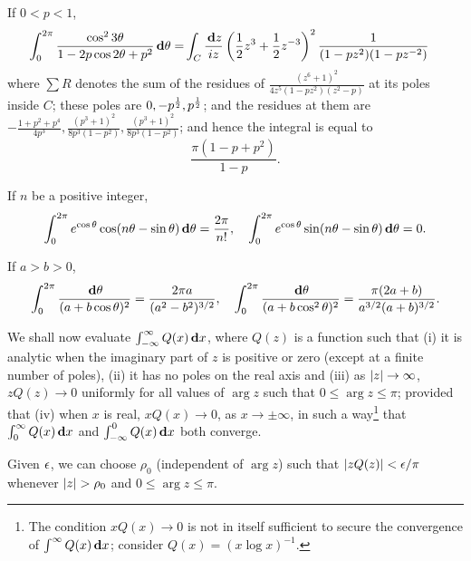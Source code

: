 \begin{wandwexample}
  If $0 < p < 1$,
  \begin{align*}
    \int_{0}^{2\pi} \frac{ \cos^{2} 3\theta}{1-2p\cos 2\theta + p^{2}}
    \, \mathbf{d} \theta
    =&
    \int_{C} \frac{\, \mathbf{d} z}{iz}
    \left(  \frac{1}{2} z^{3} + \frac{1}{2} z^{-3} \right)^{2}
    \frac{1}{ (1-pz^{2})(1-pz^{-2})}
  \end{align*}
  where $\sum R$ denotes the sum of the residues of
  $ \frac{ (z^{6} + 1)^{2} }{ 4z^{5} (1-pz^{2})(z^{2}-p)} $ at its poles
  inside $C$; these poles are $0, -p^{\frac{1}{2}}, p^{\frac{1}{2}}$;
  and the residues at them are
  $ -\frac{1+p^{2}+p^{4}}{4p^{3}},
  \frac{(p^{3}+1)^{2}}{ 8p^{3}(1-p^{2})},
  \frac{(p^{3}+1)^{2}}{ 8p^{3}(1-p^{2})}$; %
  and hence the integral is equal to
  $$
  \frac{\pi (1-p+p^{2})}{1-p}.
  $$
\end{wandwexample}
\begin{wandwexample}
  If $n$ be a positive integer,
  $$
  \int_{0}^{2\pi} e^{\cos\theta} \cos(n\theta - \sin\theta)
  \, \mathbf{d} \theta
  =
  \frac{2\pi}{n!},
  \quad
  \int_{0}^{2\pi}
  e^{\cos\theta} \sin(n\theta - \sin\theta) \, \mathbf{d} \theta
  =
  0.
  $$
\end{wandwexample}
\begin{wandwexample}
  If $a>b>0$,
  $$
  \int_{0}^{2\pi}
  \frac{\, \mathbf{d} \theta}{ (a+b\cos\theta)^{2}}
  =
  \frac{2\pi a}{ (a^{2}-b^{2})^{3/2} },
  \quad
  \int_{0}^{2\pi}
  \frac{\, \mathbf{d}\theta}{ (a+b\cos^{2}\theta)^{2}}
  =
  \frac{\pi(2a+b)}{ a^{3/2} (a+b)^{3/2}}.
  $$
\end{wandwexample}
We shall now evaluate $\int_{-\infty}^{\infty} Q(x) \, \mathbf{d} x$,
where $Q(z)$ is a function such that (i) it is analytic when the
imaginary part of $z$ is positive or zero (except at a finite number
of poles), (ii) it has no poles on the real axis and (iii) as
$\left| z \right|\rightarrow\infty$, $zQ(z) \rightarrow 0$ uniformly for all
values of $\arg z$ such that $0 \leq \arg z \leq \pi$; provided that
(iv) when $x$ is real, $x Q(x) \rightarrow 0$, as
$x \rightarrow \pm\infty$, in such a way\footnote{The condition
  $x Q(x)\rightarrow 0$ is not in itself sufficient to secure the
  convergence of 
  $\int^{\infty} Q(x) \, \mathbf{d} x$;
  consider $Q(x) = (x \log x)^{-1}$.}
that $\int_{0}^{\infty} Q(x) \, \mathbf{d} x$ and
$\int_{-\infty}^{0} Q(x) \, \mathbf{d} x$ both converge.

Given $\epsilon$, we can choose $\rho_{0}$ (independent of $\arg z$) such
that $\left| z Q(z) \right| < \epsilon/\pi$ whenever
$\left| z \right| > \rho_{0}$ and $0 \leq \arg z \leq \pi$.

